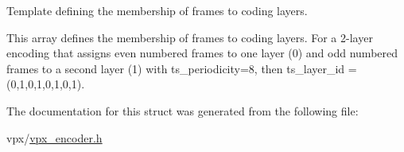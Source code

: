 \-Template defining the membership of frames to coding layers. 

\-This array defines the membership of frames to coding layers. \-For a 2-\/layer encoding that assigns even numbered frames to one layer (0) and odd numbered frames to a second layer (1) with ts\-\_\-periodicity=8, then ts\-\_\-layer\-\_\-id = (0,1,0,1,0,1,0,1). 

\-The documentation for this struct was generated from the following file\-:\begin{DoxyCompactItemize}
\item 
vpx/\hyperlink{vpx__encoder_8h}{vpx\-\_\-encoder.\-h}\end{DoxyCompactItemize}
